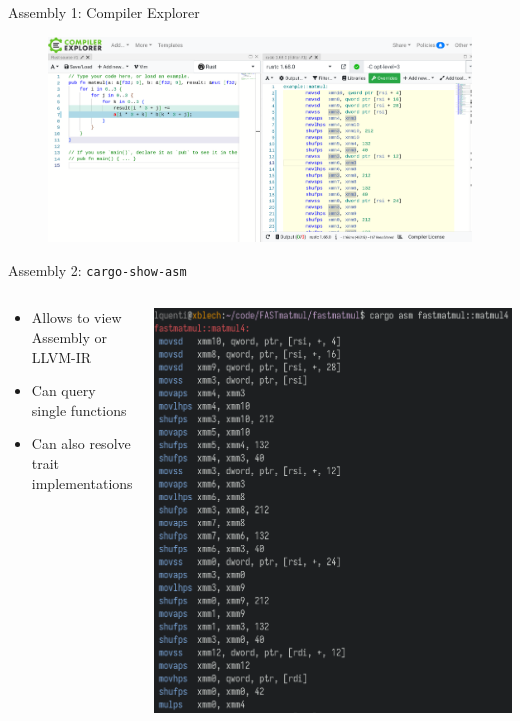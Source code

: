 \documentclass[compress,aspectratio=169]{beamer}
\begin{document}
\begin{frame}{Assembly 1: Compiler Explorer \cite{godbolt}}
  \begin{figure}[h]
    \includegraphics[width=\textwidth]{./assets/compilerexplorer.png}
  \end{figure}
\end{frame}

\begin{frame}{Assembly 2: \texttt{cargo-show-asm} \cite{cargo-asm}}
  \begin{columns}
    \begin{column}{0.5\textwidth}
      \begin{itemize}
        \item Allows to view Assembly or LLVM-IR
        \item Can query single functions
        \item Can also resolve trait implementations
      \end{itemize}
    \end{column}
    \begin{column}{0.5\textwidth}
    \includegraphics[height=.9\textheight]{./assets/cargoasm.png}
    \end{column}
  \end{columns}
\end{frame}
\end{document}
